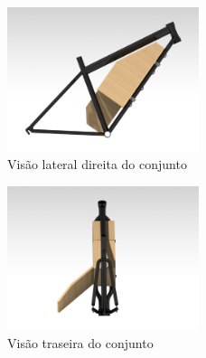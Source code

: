 		\graphicspath{{figuras/}}	
		\begin{figure}[h!]
			\centering
			\includegraphics[width=0.5\textwidth]{box_ldireita.png}
			\caption{Visão lateral direita do conjunto}
			\label{img:box_ldireita}
		\end{figure}
		\graphicspath{{figuras/}}	
		\begin{figure}[h!]
			\centering
			\includegraphics[width=0.5\textwidth]{box_traseira.png}
			\caption{Visão traseira do conjunto}
			\label{img:box_traseira}
		\end{figure}
	

